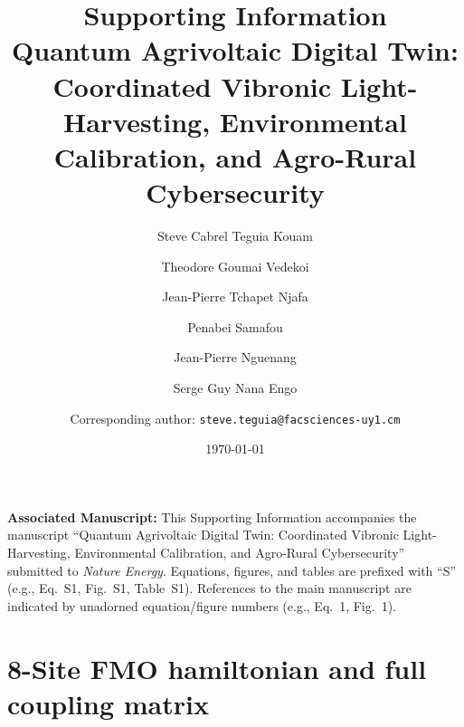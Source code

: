 \documentclass[11pt,a4paper]{article}
\begin{document}
\title{\textbf{Supporting Information}\\[0.5em]
\large Quantum Agrivoltaic Digital Twin: Coordinated Vibronic Light-Harvesting, Environmental Calibration, and Agro-Rural Cybersecurity}

\author{Steve Cabrel Teguia Kouam}
\author{Theodore Goumai Vedekoi}
\author{Jean-Pierre Tchapet Njafa}
\author{Penabei Samafou}
\author{Jean-Pierre Nguenang}
\author{Serge Guy Nana Engo}
\author{Corresponding author: \texttt{steve.teguia@facsciences-uy1.cm}}

\date{\today}

\maketitle

\noindent\textbf{Associated Manuscript:}
This Supporting Information accompanies the manuscript ``Quantum Agrivoltaic Digital Twin: Coordinated Vibronic Light-Harvesting, Environmental Calibration, and Agro-Rural Cybersecurity'' submitted to \textit{Nature Energy}.
Equations, figures, and tables are prefixed with ``S'' (e.g., Eq.~S1, Fig.~S1, Table~S1).
References to the main manuscript are indicated by unadorned equation/figure numbers (e.g., Eq.~1, Fig.~1).

\vspace{1em}

\tableofcontents

\newpage


\section{8-Site FMO hamiltonian and full coupling matrix}
\label{SI-sec:hamiltonian}
\end{document}
